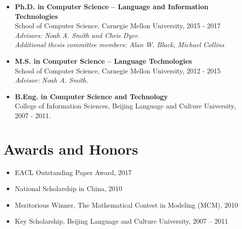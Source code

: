 \documentclass[letterpaper]{article}
\begin{document}
\begin{itemize}
  \item \textbf{Ph.D. in Computer Science -- Language and Information Technologies}\\
  School of Computer Science, Carnegie Mellon University, 2015 - 2017 \\
  {\it Advisors: Noah A. Smith and Chris Dyer.} \\
  {\it Additional thesis committee members: Alan W. Black, Michael Collins}

  \item \textbf{M.S. in Computer Science -- Language Technologies}\\
  School of Computer Science, Carnegie Mellon University, 2012 - 2015\\
  {\it Advisor: Noah A. Smith.}

 
 \item \textbf{B.Eng. in Computer Science and Technology}\\
College of Information Sciences, Beijing Language and Culture University, 2007 - 2011.
\end{itemize}
\section*{Awards and Honors}
\begin{itemize}
\item EACL Outstanding Paper Award, 2017
\item National Scholarship in China, 2010
\item Meritorious Winner, The Mathematical Contest in Modeling (MCM), 2010
\item Key Scholarship, Beijing Language and Culture University, 2007 -- 2011
\end{itemize}
\end{document}
